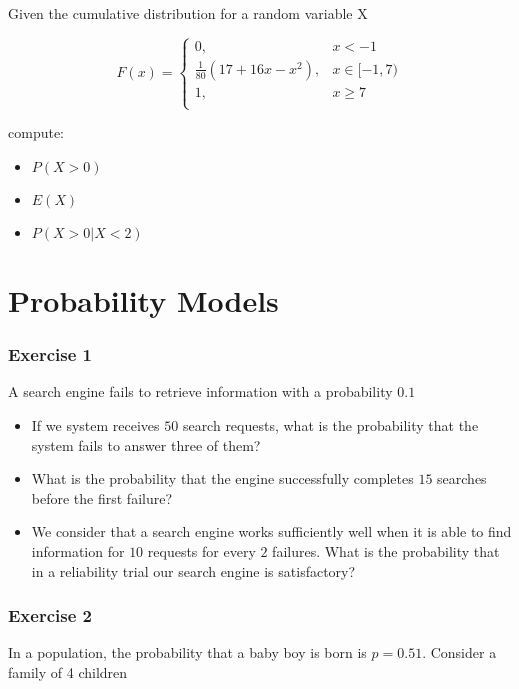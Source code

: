 \documentclass[
]{book}
\providecommand{\tightlist}{%
  \setlength{\itemsep}{0pt}\setlength{\parskip}{0pt}}
\begin{document}
Given the cumulative distribution for a random variable X

\[
    F(x)= 
\begin{cases}
0, & x  < -1 \\
\frac{1}{80}(17+16x-x^2),& x \in [-1,7)\\
1,& x \geq 7\\
\end{cases}
\]

compute:

\begin{itemize}
\tightlist
\item
  \(P(X>0)\)
\item
  \(E(X)\)
\item
  \(P(X>0|X<2)\)
\end{itemize}

\hypertarget{probability-models}{%
\section{Probability Models}\label{probability-models}}

\hypertarget{exercise-1-4}{%
\subsubsection{Exercise 1}\label{exercise-1-4}}

A search engine fails to retrieve information with a probability \(0.1\)

\begin{itemize}
\item
  If we system receives \(50\) search requests, what is the probability that the system fails to answer three of them?
\item
  What is the probability that the engine successfully completes \(15\) searches before the first failure?
\item
  We consider that a search engine works sufficiently well when it is able to find information for \(10\) requests for every \(2\) failures. What is the probability that in a reliability trial our search engine is satisfactory?
\end{itemize}

\hypertarget{exercise-2-4}{%
\subsubsection{Exercise 2}\label{exercise-2-4}}

In a population, the probability that a baby boy is born is \(p=0.51\). Consider a family of 4 children
\end{document}
